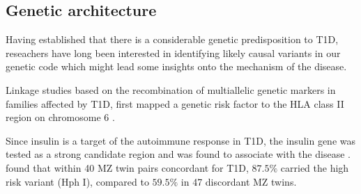 


\subsection{Genetic architecture}

Having established that there is a considerable genetic predisposition to T1D, reseachers have long been interested in identifying likely causal variants in our genetic code which might lead some insights onto the mechanism of the disease.

Linkage studies based on the recombination of multiallelic genetic markers in families affected by T1D,
first mapped a genetic risk factor to the HLA class II region on chromosome 6 \citep{Singal:1973tg,Cudworth:1974ve,Nerup:1974ui}.

Since insulin is a target of the autoimmune response in T1D, the insulin gene  was tested as a strong candidate region and was found to associate with
the disease \citep{Metcalfe:2001}. 
\citet{Metcalfe:2001} found that within 40 \gls{MZ} twin pairs concordant for T1D, $87.5\%$ carried the high risk  variant (Hph I),
compared to $59.5\%$ in 47 discordant MZ twins.

